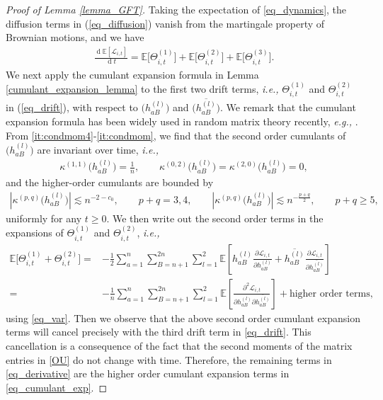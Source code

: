 \documentclass[10pt,reqno]{amsart}
\numberwithin{equation}{section}
\numberwithin{figure}{section}
\theoremstyle{plain}
\newcommand{\<}{\langle}
\renewcommand{\>}{\rangle}
\newcommand{\E}{\mathbb{E}}
\newcommand{\dd}{\operatorname{d}\!{}}
\newcommand{\ie}{\emph{i.e., }}
\newcommand{\eg}{\emph{e.g., }}
\newcommand{\II}{\mathcal{L}_{i,t}}
\begin{document}
\begin{proof}[Proof of Lemma \ref{lemma_GFT}]
	
	Taking the expectation of \eqref{eq_dynamics}, the diffusion terms in (\ref{eq_diffusion}) vanish from the martingale property of Brownian motions, and we have
	\begin{align}
		\frac{\dd \E[\II]}{\dd t}=\E\big[\Theta^{(1)}_{i,t}\big]+\E\big[\Theta^{(2)}_{i,t}\big]+\E\big[\Theta^{(3)}_{i,t}\big].
	\end{align}
We next apply the cumulant expansion formula  in Lemma \ref{cumulant_expansion_lemma} to the first two drift terms, \ie $\Theta^{(1)}_{i,t}$ and $\Theta^{(2)}_{i,t}$ in (\ref{eq_drift}), with respect to $\big(h^{(l)}_{aB}\big)$ and $\big(\overline{h^{(l)}_{aB}}\big)$.  We remark that the cumulant expansion formula has been widely used in random matrix theory recently, \eg \cite{zbMATH06775355,zbMATH07549410,cipolloni2024universalityextremaleigenvalueslarge}. 
%
%
%
%
From \ref{it:condmom4}-\ref{it:condmom}, we find that the second order cumulants of $\big(h^{(l)}_{aB}\big)$ are invariant over time, \ie
\begin{align}\label{eq_var}
	\kappa^{(1,1)}\big(h^{(l)}_{aB}\big)=\frac{1}{n}, \qquad \kappa^{(0,2)}\big(h^{(l)}_{aB}\big)=\kappa^{(2,0)}\big(h^{(l)}_{aB}\big)=0, 
\end{align}
and the higher-order cumulants are bounded by
\begin{align}\label{eq_cumu_bound}
	|\kappa^{(p,q)}\big(h^{(l)}_{aB}\big)| \lesssim  n^{-2-c_0},\qquad p+q=3,4, \qquad |\kappa^{(p,q)}\big(h^{(l)}_{aB}\big)| \lesssim  n^{-\frac{p+q}{2}}, \qquad p+q\geq 5,
\end{align}
uniformly for any $t\geq 0$. We then write out the second order terms in the expansions of $\Theta^{(1)}_{i,t}$ and $\Theta^{(2)}_{i,t}$, \ie
\begin{align}\label{eq_cumulant_exp}
	\mathbb{E} \big[  \Theta^{(1)}_{i,t}+\Theta^{(2)}_{i,t} \big]=&-\frac{1}{2}\sum_{a=1}^n \sum_{B=n+1}^{2n} \sum_{l=1}^2  \mathbb{E} \left[ h^{(l)}_{aB} \frac{  \partial \II}{\partial h^{(l)}_{aB}}  +\overline{h^{(l)}_{aB}} \frac{\partial \II}{\partial \overline{h^{(l)}_{aB}}} \right]\nonumber\\
	=&-\frac{1}{n}\sum_{a=1}^n \sum_{B=n+1}^{2n} \sum_{l=1}^2  \mathbb{E} \left[   \frac{  \partial^2 \II}{\partial h^{(l)}_{aB} \partial \overline{h^{(l)}_{aB}}}  \right]+\mbox{higher order terms},
\end{align}
using \eqref{eq_var}. Then we observe that the above second order cumulant expansion terms will cancel precisely with the third drift term in \eqref{eq_drift}.
This cancellation is a consequence of the fact that the second moments of the matrix entries in \eqref{OU} do not change with time. Therefore, the remaining terms in \eqref{eq_derivative} are the higher order cumulant expansion terms in \eqref{eq_cumulant_exp}. 




\end{proof}
\end{document}
